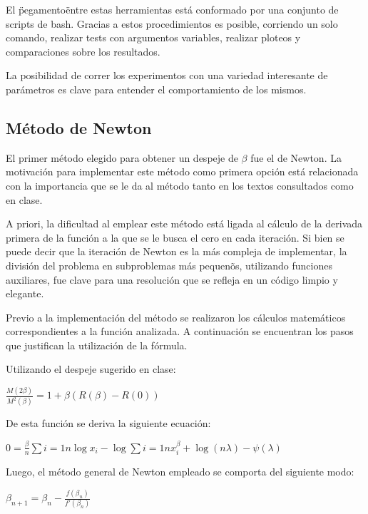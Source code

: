 El \"pegamento\" entre estas herramientas est\'a conformado por una conjunto de
scripts de bash. Gracias a estos procedimientos es posible, corriendo un solo
comando, realizar tests con argumentos variables, realizar ploteos y
comparaciones sobre los resultados.

La posibilidad de correr los experimentos con una variedad interesante de
par\'ametros es clave para entender el comportamiento de los mismos.

\subsection{M\'etodo de Newton}

El primer m\'etodo elegido para obtener un despeje de $\beta$ fue el de Newton. 
La motivaci\'on para implementar este m\'etodo como primera opci\'on est\'a 
relacionada con la importancia que se le da al m\'etodo tanto en los textos 
consultados como en clase.

A priori, la dificultad al emplear este m\'etodo est\'a ligada al c\'alculo de 
la derivada primera de la funci\'on a la que se le busca el cero en cada 
iteraci\'on. Si bien se puede decir que la iteraci\'on de Newton es la m\'as 
compleja de implementar, la divisi\'on del problema en subproblemas 
m\'as pequen\~os, utilizando funciones auxiliares, fue clave para una 
resoluci\'on que se refleja en un c\'odigo limpio y elegante.

Previo a la implementaci\'on del m\'etodo se realizaron los c\'alculos 
matem\'aticos correspondientes a la funci\'on analizada. 
A continuaci\'on se encuentran los pasos que justifican la utilizaci\'on 
de la f\'ormula.

Utilizando el despeje sugerido en clase:

\begin{center}
$\frac{M(2\beta)}{M^2(\beta)}=1 + \beta(R(\beta)-R(0))$\\
\end{center}

De esta funci\'on se deriva la siguiente ecuaci\'on: 

\begin{center}
$0 = \frac{\beta}{n}\sum{i=1}{n}\log x_i - \log \sum{i=1}{n}x_i^{\beta} 
+ \log(n\lambda)-\psi(\lambda)$\\
\end{center}

Luego, el m\'etodo general de Newton empleado se comporta del siguiente modo: 
\begin{center}

$\beta_{n+1} = \beta_{n} - \frac{f(\beta_{n})}{f'(\beta_{n})}$\\

\end{center}

